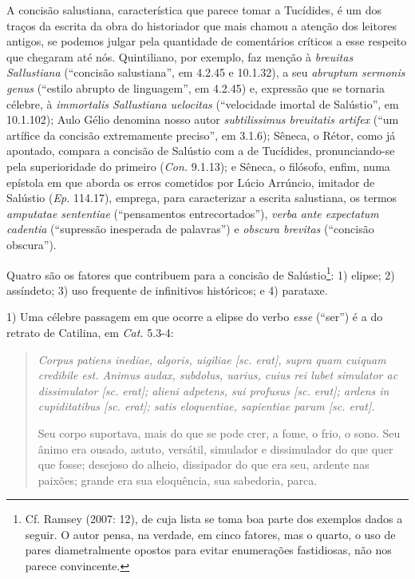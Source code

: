 A concisão salustiana, característica que parece tomar a Tucídides, é um dos
traços da escrita da obra do historiador que mais chamou a atenção dos leitores
antigos, se podemos julgar pela quantidade de comentários críticos a esse
respeito que chegaram até nós. Quintiliano, por exemplo, faz menção à
\emph{breuitas Sallustiana} (“concisão salustiana”, em 4.2.45 e 10.1.32), a  seu \emph{abruptum sermonis genus }(“estilo abrupto de linguagem”, em 4.2.45) e,
expressão que se tornaria célebre, à \emph{immortalis Sallustiana uelocitas}
(“velocidade imortal de Salústio”, em 10.1.102); Aulo Gélio denomina nosso autor
\emph{subtilissimus breuitatis artifex} (“um artífice da concisão extremamente
preciso”, em 3.1.6); Sêneca, o Rétor, como já apontado, compara a concisão de
Salústio com a de Tucídides, pronunciando-se pela superioridade do primeiro
(\emph{Con.} 9.1.13); e Sêneca, o filósofo, enfim, numa epístola em que aborda os erros cometidos por Lúcio Arrúncio,
imitador de Salústio (\emph{Ep.} 114.17), emprega, para caracterizar a escrita salustiana, os termos \emph{amputatae sententiae} (``pensamentos entrecortados''), \emph{verba ante expectatum cadentia} (``supressão inesperada de palavras'') e \emph{obscura brevitas} (``concisão obscura''). 




Quatro são os fatores que contribuem para a concisão de
Salústio\footnote{Cf. Ramsey (2007: 12), de cuja lista se toma boa parte dos
exemplos dados a seguir. O autor  pensa, na verdade, em cinco fatores, mas o
quarto, o uso de pares diametralmente opostos para evitar enumerações
fastidiosas, não nos parece convincente.}: 1) elipse; 2) assíndeto; 3) uso
frequente de infinitivos históricos; e 4) parataxe.  


1) Uma célebre passagem em
que ocorre a elipse do verbo \emph{esse} (“ser”) é a do retrato de Catilina, em \emph{Cat.} 
5.3-4: \begin{quote} \emph{Corpus patiens inediae, algoris, uigiliae [sc. erat],
  supra quam cuiquam credibile est. Animus audax, subdolus, uarius, cuius rei
lubet simulator ac dissimulator [sc. erat]; alieni adpetens, sui profusus [sc.
erat]; ardens in cupiditatibus [sc. erat]; satis eloquentiae, sapientiae parum
[sc. erat].}

Seu corpo suportava, mais do que se pode crer, a fome, o frio, o sono. Seu
ânimo era ousado, astuto, versátil, simulador e dissimulador do que quer que
fosse; desejoso do alheio, dissipador do que era seu, ardente nas paixões;
grande era sua eloquência, sua sabedoria, parca.  \end{quote}

